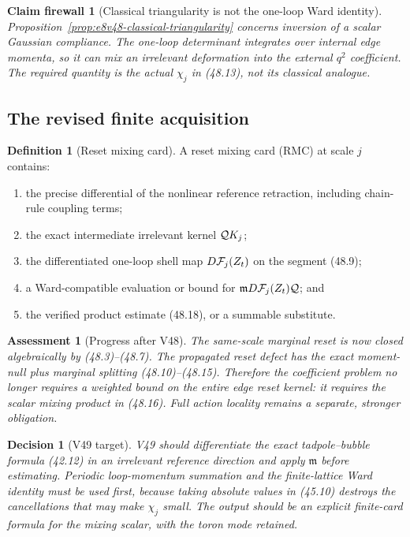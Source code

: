 \documentclass[11pt,oneside]{book}
\newtheorem{assessment}[theorem]{Assessment}
\newtheorem{firewall}[theorem]{Claim firewall}
\newtheorem{decision}[theorem]{Decision}
\theoremstyle{definition}
\newtheorem{definition}[theorem]{Definition}
\theoremstyle{remark}
\begin{document}
\begin{firewall}[Classical triangularity is not the one-loop Ward
identity]
\label{fire:e8v48-classical-not-loop}
Proposition~\ref{prop:e8v48-classical-triangularity} concerns
inversion of a scalar Gaussian compliance.  The one-loop
determinant integrates over internal edge momenta, so it can mix an
irrelevant deformation into the external \(q^2\) coefficient.
The required quantity is the actual \(\chi_j\) in (48.13), not its
classical analogue.
\end{firewall}

\subsection{The revised finite acquisition}

\begin{definition}[Reset mixing card]
\label{def:e8v48-RMC}
A reset mixing card (RMC) at scale \(j\) contains:
\begin{enumerate}
\item the precise differential of the nonlinear reference
      retraction, including chain-rule coupling terms;
\item the exact intermediate irrelevant kernel
      \({\cal Q}K_j\);
\item the differentiated one-loop shell map
      \(D{\cal F}_j(Z_t)\) on the segment (48.9);
\item a Ward-compatible evaluation or bound for
      \({\mathfrak m}D{\cal F}_j(Z_t){\cal Q}\); and
\item the verified product estimate (48.18), or a summable
      substitute.
\end{enumerate}
\end{definition}

\begin{assessment}[Progress after V48]
\label{ass:e8v48-status}
The same-scale marginal reset is now closed algebraically by
(48.3)--(48.7).  The propagated reset defect has the exact
moment-null plus marginal splitting (48.10)--(48.15).  Therefore
the coefficient problem no longer requires a weighted bound on the
entire edge reset kernel: it requires the scalar mixing product in
(48.16).  Full action locality remains a separate, stronger
obligation.
\end{assessment}

\begin{decision}[V49 target]
\label{dec:e8v48-next}
V49 should differentiate the exact tadpole--bubble formula
(42.12) in an irrelevant reference direction and apply
\(\mathfrak m\) before estimating.  Periodic loop-momentum
summation and the finite-lattice Ward identity must be used first,
because taking absolute values in (45.10) destroys the
cancellations that may make \(\chi_j\) small.  The output should be
an explicit finite-card formula for the mixing scalar, with the
toron mode retained.
\end{decision}
\end{document}
